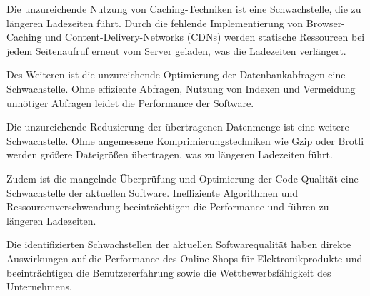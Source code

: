 Die unzureichende Nutzung von Caching-Techniken ist eine Schwachstelle, die zu längeren Ladezeiten führt. Durch die fehlende Implementierung von Browser-Caching und Content-Delivery-Networks (CDNs) werden statische Ressourcen bei jedem Seitenaufruf erneut vom Server geladen, was die Ladezeiten verlängert.

Des Weiteren ist die unzureichende Optimierung der Datenbankabfragen eine Schwachstelle. Ohne effiziente Abfragen, Nutzung von Indexen und Vermeidung unnötiger Abfragen leidet die Performance der Software.

Die unzureichende Reduzierung der übertragenen Datenmenge ist eine weitere Schwachstelle. Ohne angemessene Komprimierungstechniken wie Gzip oder Brotli werden größere Dateigrößen übertragen, was zu längeren Ladezeiten führt.

Zudem ist die mangelnde Überprüfung und Optimierung der Code-Qualität eine Schwachstelle der aktuellen Software. Ineffiziente Algorithmen und Ressourcenverschwendung beeinträchtigen die Performance und führen zu längeren Ladezeiten.

Die identifizierten Schwachstellen der aktuellen Softwarequalität haben direkte Auswirkungen auf die Performance des Online-Shops für Elektronikprodukte und beeinträchtigen die Benutzererfahrung sowie die Wettbewerbsfähigkeit des Unternehmens.